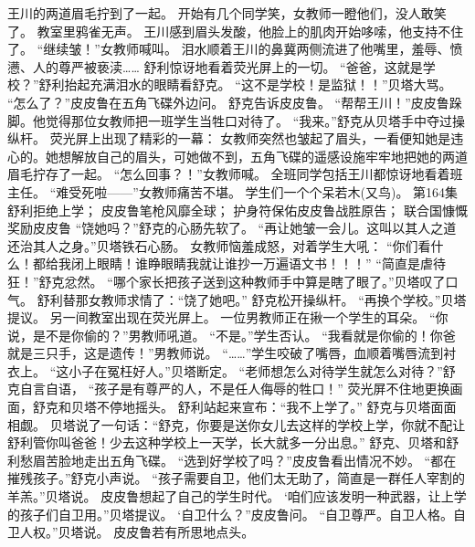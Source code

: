 \documentclass[a4paper,12pt,UTF8,twoside]{ctexbook}
\begin{document}
        王川的两道眉毛拧到了一起。 
        开始有几个同学笑，女教师一瞪他们，没人敢笑了。 
        教室里鸦雀无声。 
        王川感到眉头发酸，他脸上的肌肉开始哆嗦，他支持不住了。 
        “继续皱！”女教师喊叫。 
        泪水顺着王川的鼻冀两侧流进了他嘴里，羞辱、愤懑、人的尊严被亵渎…… 
        舒利惊讶地看着荧光屏上的一切。 
        “爸爸，这就是学校？”舒利抬起充满泪水的眼睛看舒克。 
        “这不是学校！是监狱！！”贝塔大骂。 
        “怎么了？”皮皮鲁在五角飞碟外边问。 
        舒克告诉皮皮鲁。 
        “帮帮王川！”皮皮鲁跺脚。他觉得那位女教师把一班学生当牲口对待了。 
        “我来。”舒克从贝塔手中夺过操纵杆。 
        荧光屏上出现了精彩的一幕： 
        女教师突然也皱起了眉头，一看便知她是违心的。她想解放自己的眉头，可她做不到，五角飞碟的遥感设施牢牢地把她的两道眉毛拧存了一起。 
        “怎么回事？！”女教师喊。 
        全班同学包括王川都惊讶地看着班主任。 
        “难受死啦——”女教师痛苦不堪。 
        学生们一个个呆若木(又鸟)。   第164集 
        舒利拒绝上学； 
        皮皮鲁笔枪风靡全球； 
        护身符保佑皮皮鲁战胜原告； 
        联合国慷慨奖励皮皮鲁   
        “饶她吗？”舒克的心肠先软了。 
        “再让她皱一会儿。这叫以其人之道还治其人之身。”贝塔铁石心肠。 
        女教师恼羞成怒，对着学生大吼： 
        “你们看什么！都给我闭上眼睛！谁睁眼睛我就让谁抄一万遍语文书！！！” 
        “简直是虐待狂！”舒克忿然。 
        “哪个家长把孩子送到这种教师手中算是瞎了眼了。”贝塔叹了口气。 
        舒利替那女教师求情了：“饶了她吧。” 
        舒克松开操纵杆。 
        “再换个学校。”贝塔提议。 
        另一间教室出现在荧光屏上。 
        一位男教师正在揪一个学生的耳朵。 
        “你说，是不是你偷的？”男教师吼道。 
        “不是。”学生否认。 
        “我看就是你偷的！你爸就是三只手，这是遗传！”男教师说。 
        “……”学生咬破了嘴唇，血顺着嘴唇流到衬衣上。 
        “这小子在冤枉好人。”贝塔断定。 
        “老师想怎么对待学生就怎么对待？”舒克自言自语，  “孩子是有尊严的人，不是任人侮辱的牲口！” 
        荧光屏不住地更换画面，舒克和贝塔不停地摇头。 
        舒利站起来宣布：“我不上学了。” 
        舒克与贝塔面面相觑。 
        贝塔说了一句话：“舒克，你要是送你女儿去这样的学校上学，你就不配让舒利管你叫爸爸！少去这种学校上一天学，长大就多一分出息。” 
        舒克、贝塔和舒利愁眉苦脸地走出五角飞碟。 
        “选到好学校了吗？”皮皮鲁看出情况不妙。 
        “都在摧残孩子。”舒克小声说。 
        “孩子需要自卫，他们太无助了，简直是一群任人宰割的羊羔。”贝塔说。 
        皮皮鲁想起了自己的学生时代。 
        ‘咱们应该发明一种武器，让上学的孩子们自卫用。”贝塔提议。 
        ‘自卫什么？”皮皮鲁问。 
        “自卫尊严。自卫人格。自卫人权。”贝塔说。 
        皮皮鲁若有所思地点头。 
\end{document}
